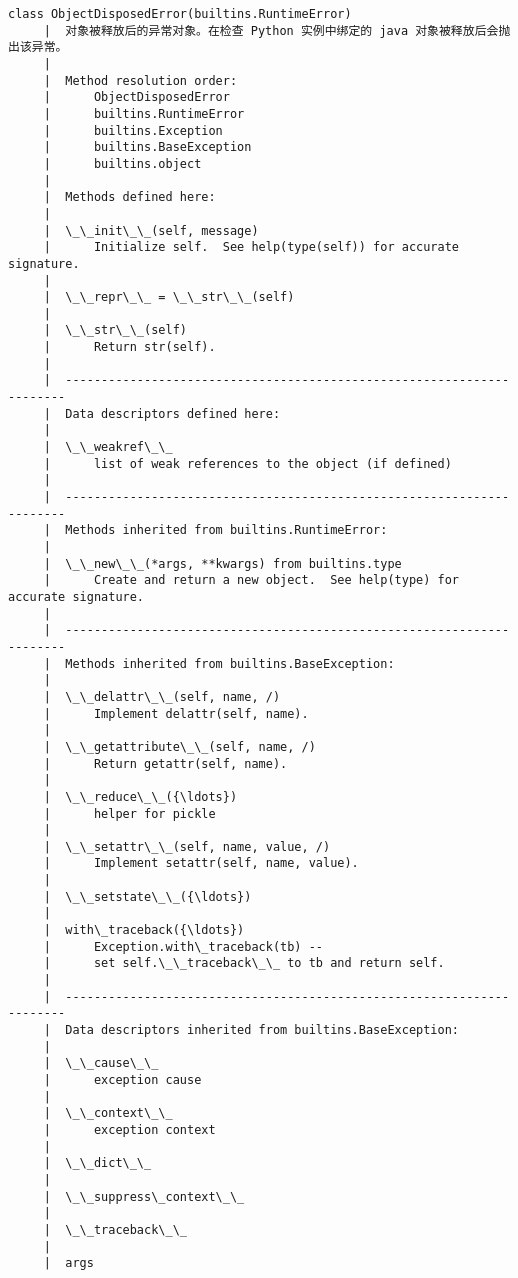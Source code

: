 \documentclass[11pt]{article}
\begin{document}
\begin{Verbatim}[commandchars=\\\{\}]
    class ObjectDisposedError(builtins.RuntimeError)
     |  对象被释放后的异常对象。在检查 Python 实例中绑定的 java 对象被释放后会抛出该异常。
     |  
     |  Method resolution order:
     |      ObjectDisposedError
     |      builtins.RuntimeError
     |      builtins.Exception
     |      builtins.BaseException
     |      builtins.object
     |  
     |  Methods defined here:
     |  
     |  \_\_init\_\_(self, message)
     |      Initialize self.  See help(type(self)) for accurate signature.
     |  
     |  \_\_repr\_\_ = \_\_str\_\_(self)
     |  
     |  \_\_str\_\_(self)
     |      Return str(self).
     |  
     |  ----------------------------------------------------------------------
     |  Data descriptors defined here:
     |  
     |  \_\_weakref\_\_
     |      list of weak references to the object (if defined)
     |  
     |  ----------------------------------------------------------------------
     |  Methods inherited from builtins.RuntimeError:
     |  
     |  \_\_new\_\_(*args, **kwargs) from builtins.type
     |      Create and return a new object.  See help(type) for accurate signature.
     |  
     |  ----------------------------------------------------------------------
     |  Methods inherited from builtins.BaseException:
     |  
     |  \_\_delattr\_\_(self, name, /)
     |      Implement delattr(self, name).
     |  
     |  \_\_getattribute\_\_(self, name, /)
     |      Return getattr(self, name).
     |  
     |  \_\_reduce\_\_({\ldots})
     |      helper for pickle
     |  
     |  \_\_setattr\_\_(self, name, value, /)
     |      Implement setattr(self, name, value).
     |  
     |  \_\_setstate\_\_({\ldots})
     |  
     |  with\_traceback({\ldots})
     |      Exception.with\_traceback(tb) --
     |      set self.\_\_traceback\_\_ to tb and return self.
     |  
     |  ----------------------------------------------------------------------
     |  Data descriptors inherited from builtins.BaseException:
     |  
     |  \_\_cause\_\_
     |      exception cause
     |  
     |  \_\_context\_\_
     |      exception context
     |  
     |  \_\_dict\_\_
     |  
     |  \_\_suppress\_context\_\_
     |  
     |  \_\_traceback\_\_
     |  
     |  args
    

\end{Verbatim}
\end{document}
